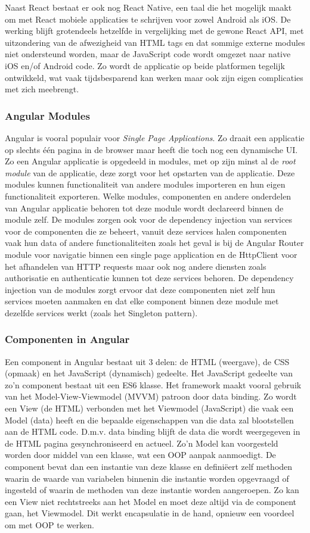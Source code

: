 Naast React bestaat er ook nog React Native, een taal die het mogelijk maakt om met React mobiele applicaties te schrijven voor zowel Android als iOS. De werking blijft grotendeels hetzelfde in vergelijking met de gewone React API, met uitzondering van de afwezigheid van HTML tags en dat sommige externe modules niet ondersteund worden, maar de JavaScript code wordt omgezet naar native iOS en/of Android code. Zo wordt de applicatie op beide platformen tegelijk ontwikkeld, wat vaak tijdsbesparend kan werken maar ook zijn eigen complicaties met zich meebrengt.

\subsubsection{Angular Modules}
Angular is vooral populair voor \textit{Single Page Applications}. Zo draait een applicatie op slechts één pagina in de browser maar heeft die toch nog een dynamische UI. Zo een Angular applicatie is opgedeeld in modules, met op zijn minst al de \textit{root module} van de applicatie, deze zorgt voor het opstarten van de applicatie. Deze modules kunnen functionaliteit van andere modules importeren en hun eigen functionaliteit exporteren. Welke modules, componenten en andere onderdelen van Angular applicatie behoren tot deze module wordt declareerd binnen de module zelf. De modules zorgen ook voor de dependency injection van services voor de componenten die ze beheert, vanuit deze services halen componenten vaak hun data of andere functionaliteiten zoals het geval is bij de Angular Router module voor navigatie binnen een single page application en de HttpClient voor het afhandelen van HTTP requests maar ook nog andere diensten zoals authorisatie en authenticatie kunnen tot deze services behoren. De dependency injection van de modules zorgt ervoor dat deze componenten niet zelf hun services moeten aanmaken en dat elke component binnen deze module met dezelfde services werkt (zoals het Singleton pattern). 

\subsubsection{Componenten in Angular}
Een component in Angular bestaat uit 3 delen: de HTML (weergave), de CSS (opmaak) en het JavaScript (dynamisch) gedeelte. Het JavaScript gedeelte van zo'n component bestaat uit een ES6 klasse. Het framework maakt vooral gebruik van het Model-View-Viewmodel (MVVM) patroon door data binding. Zo wordt een View (de HTML) verbonden met het Viewmodel (JavaScript) die vaak een Model (data) heeft en die bepaalde eigenschappen van die data zal blootstellen aan de HTML code. D.m.v. data binding blijft de data die wordt weergegeven in de HTML pagina gesynchroniseerd en actueel. Zo'n Model kan voorgesteld worden door middel van een klasse, wat een OOP aanpak aanmoedigt. De component bevat dan een instantie van deze klasse en definiëert zelf methoden waarin de waarde van variabelen binnenin die instantie worden opgevraagd of ingesteld of waarin de methoden van deze instantie worden aangeroepen. Zo kan een View niet rechtstreeks aan het Model en moet deze altijd via de component gaan, het Viewmodel. Dit werkt encapsulatie in de hand, opnieuw een voordeel om met OOP te werken.

